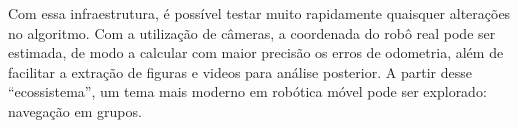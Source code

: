 Com essa infraestrutura, é possível testar muito rapidamente quaisquer alterações no algoritmo.
Com a utilização de câmeras, a coordenada do robô real pode ser estimada, de modo a
calcular com maior precisão os erros de odometria, além de facilitar a extração de figuras e
videos para análise posterior. A partir desse ``ecossistema'', um tema mais moderno em robótica 
móvel pode ser explorado: navegação em grupos. 


 



